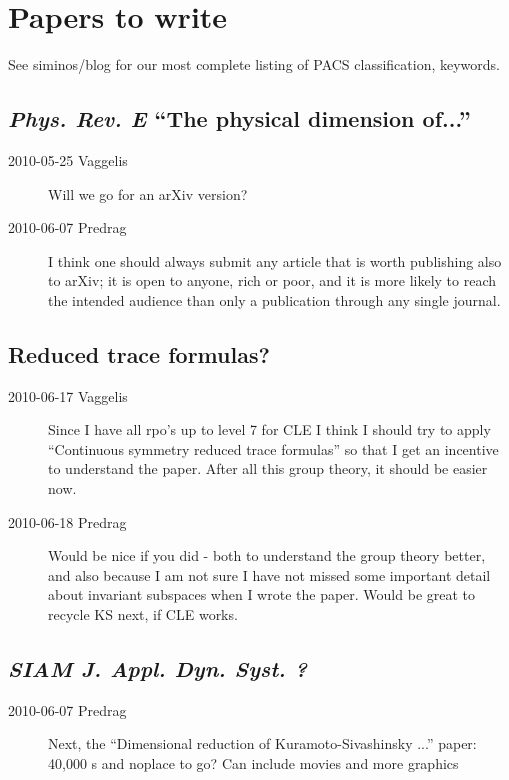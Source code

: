 \section{Papers to write}

See siminos/blog for our most complete listing of
PACS classification, keywords.

\subsection{\emph{Phys. Rev. E} ``The physical dimension of...''}

\begin{description}

\item[2010-05-25 Vaggelis]
Will we go for an arXiv version?

\item[2010-06-07 Predrag]
I think one should always submit
any article that is worth publishing also to arXiv;
it is open to anyone, rich or poor, and it is
more likely to reach the intended audience than only a publication through
any single journal.

\end{description}

\subsection{Reduced trace formulas?}

\begin{description}
 \item[2010-06-17 Vaggelis]
Since I have all rpo's up to level 7 for CLE I think I should try
to apply ``Continuous symmetry reduced trace formulas'' so that I get an incentive
to understand the paper. After all this group theory, it should be easier now.
 \item[2010-06-18 Predrag]
Would be nice if you did - both to understand the group theory better, and
also because I am not sure I have not missed some important detail about
invariant subspaces when I wrote the paper. Would be great to recycle KS
next, if CLE works.
\end{description}


\subsection{\emph{SIAM J. Appl. Dyn. Syst. ?}}

\begin{description}

\item[2010-06-07 Predrag] Next, the
``Dimensional reduction of Kuramoto-Sivashinsky ...'' paper:
40,000 \rpo s and noplace to go?
Can include movies and more graphics

\end{description}
